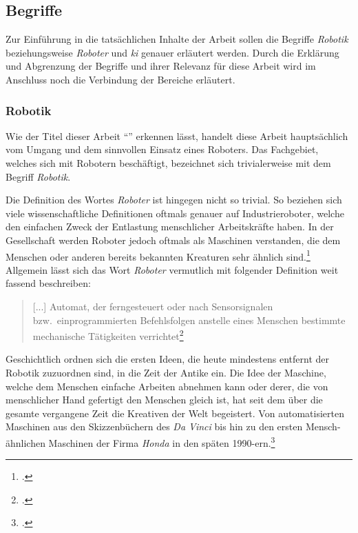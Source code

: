 \subsection{Begriffe}

Zur Einführung in die tatsächlichen Inhalte der Arbeit sollen die Begriffe \emph{Robotik} beziehungsweise \emph{Roboter} und \emph{\gls{ki}} genauer erläutert werden.
Durch die Erklärung und Abgrenzung der Begriffe und ihrer Relevanz für diese Arbeit wird im Anschluss noch die Verbindung der Bereiche erläutert.

\subsubsection{Robotik}
Wie der Titel dieser Arbeit \enquote{\mytitle} erkennen lässt, handelt diese Arbeit hauptsächlich vom Umgang und dem sinnvollen Einsatz eines Roboters.
Das Fachgebiet, welches sich mit Robotern beschäftigt, bezeichnet sich trivialerweise mit dem Begriff \emph{Robotik}.

Die Definition des Wortes \emph{Roboter} ist hingegen nicht so trivial.
So beziehen sich viele wissenschaftliche Definitionen oftmals genauer auf Industrieroboter, welche den einfachen Zweck der Entlastung menschlicher Arbeitskräfte haben.
In der Gesellschaft werden Roboter jedoch oftmals als Maschinen verstanden, die dem Menschen oder anderen bereits bekannten Kreaturen sehr ähnlich sind.\footcite{grundlagen_der_robotik}
Allgemein lässt sich das Wort \emph{Roboter} vermutlich mit folgender Definition weit fassend beschreiben:

\begin{quote}
    [...] Automat, der ferngesteuert oder nach Sensorsignalen bzw.\ einprogrammierten Befehlsfolgen anstelle eines Menschen bestimmte mechanische Tätigkeiten verrichtet\footcite{duden_roboter}
\end{quote}


Geschichtlich ordnen sich die ersten Ideen, die heute mindestens entfernt der Robotik zuzuordnen sind, in die Zeit der Antike ein.
Die Idee der Maschine, welche dem Menschen einfache Arbeiten abnehmen kann oder derer, die von menschlicher Hand gefertigt den Menschen gleich ist, hat seit dem über die gesamte vergangene Zeit die Kreativen der Welt begeistert.
Von automatisierten Maschinen aus den Skizzenbüchern des \emph{Da Vinci} bis hin zu den ersten Mensch-ähnlichen Maschinen der Firma \emph{Honda} in den späten \num{1990}-ern.\footcite{grundlagen_der_robotik}

